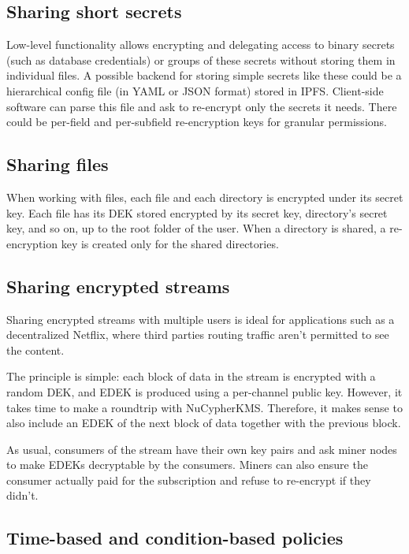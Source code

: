 \documentclass[notitlepage,longbibliography]{revtex4-1}
\newcommand{\kms}{NuCypherKMS}
\begin{document}
\subsection{Sharing short secrets}

Low-level functionality allows encrypting and delegating access to binary secrets (such as database credentials) or groups of these secrets without
storing them in individual files.
A possible backend for storing simple secrets like these could be a hierarchical config file (in YAML or JSON format) stored in IPFS.
Client-side software can parse this file and ask to re-encrypt only the secrets it needs.
There could be per-field and per-subfield re-encryption keys for granular permissions.

\subsection{Sharing files}

When working with files, each file and each directory is encrypted under its secret key.
Each file has its DEK stored encrypted by its secret key, directory's secret key, and so on, up to the root folder of the user.
When a directory is shared, a re-encryption key is created only for the shared directories.

\subsection{Sharing encrypted streams}

Sharing encrypted streams with multiple users is ideal for applications such as a decentralized Netflix, where third parties routing traffic
aren't permitted to see the content.

The principle is simple: each block of data in the stream is encrypted with a random DEK, and EDEK is produced using a per-channel public key.
However, it takes time to make a roundtrip with \kms.
Therefore, it makes sense to also include an EDEK of the next block of data together with the previous block.

As usual, consumers of the stream have their own key pairs and ask miner nodes to make EDEKs decryptable by the consumers.
Miners can also ensure the consumer actually paid for the subscription and refuse to re-encrypt if they didn't.

\subsection{Time-based and condition-based policies}
\end{document}

